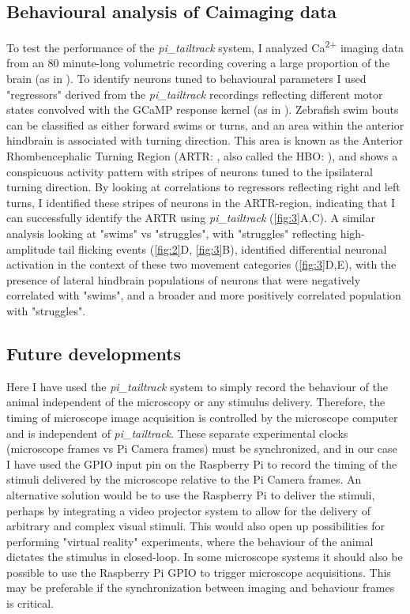 \documentclass[9pt,lineno]{RandlettLab_elife}
\begin{document}
\subsection{Behavioural analysis of Caimaging data}



To test the performance of the \emph{pi\_tailtrack} system, I analyzed Ca\textsuperscript{2+} imaging data from an 80 minute-long volumetric recording covering a large proportion of the brain (as in \cite{Lamire2023-he}). To identify neurons tuned to behavioural parameters I used "regressors" derived from the \emph{pi\_tailtrack} recordings reflecting different motor states convolved with the GCaMP response kernel (as in \cite{Miri2011-sr}). Zebrafish swim bouts can be classified as either forward swims or turns, and an area within the anterior hindbrain is associated with turning direction. This area is known as the Anterior Rhombencephalic Turning Region (ARTR: \cite{Dunn2016-bg}, also called the HBO: \cite{Ahrens2013-xh, Wolf2017-ma}), and shows a conspicuous activity pattern with stripes of neurons tuned to the ipsilateral turning direction. By looking at correlations to regressors reflecting right and left turns, I identified these stripes of neurons in the ARTR-region, indicating that I can successfully identify the ARTR using \emph{pi\_tailtrack} (\autoref{fig:3}A,C). A similar analysis looking at "swims" vs "struggles", with "struggles" reflecting high-amplitude tail flicking events (\autoref{fig:2}D, \autoref{fig:3}B), identified differential neuronal activation in the context of these two movement categories (\autoref{fig:3}D,E), with the presence of lateral hindbrain populations of neurons that were negatively correlated with "swims", and a broader and more positively correlated population with "struggles". 


\subsection{Future developments}

Here I have used the \emph{pi\_tailtrack} system to simply record the behaviour of the animal independent of the microscopy or any stimulus delivery. Therefore, the timing of microscope image acquisition is controlled by the microscope computer and is independent of \emph{pi\_tailtrack}. These separate experimental clocks (microscope frames vs Pi Camera frames) must be synchronized, and in our case I have used the GPIO input pin on the Raspberry Pi to record the timing of the stimuli delivered by the microscope relative to the Pi Camera frames. An alternative solution would be to use the Raspberry Pi to deliver the stimuli, perhaps by integrating a video projector system to allow for the delivery of arbitrary and complex visual stimuli. This would also open up possibilities for performing "virtual reality" experiments, where the behaviour of the animal dictates the stimulus in closed-loop. In some microscope systems it should also be possible to use the Raspberry Pi GPIO to trigger microscope acquisitions. This may be preferable if the synchronization between imaging and behaviour frames is critical. 
\end{document}
